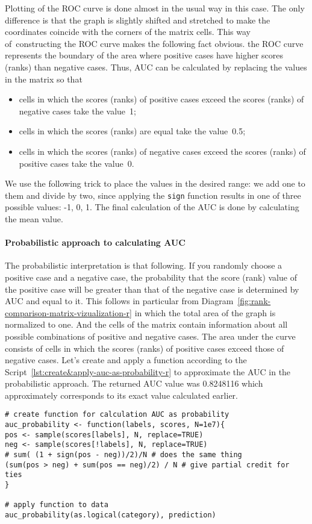 \documentclass[]{scrreprt}
\begin{document}
Plotting of the ROC curve is done almost in the usual way in this case. The only difference is that the graph is slightly shifted and stretched to make the coordinates coincide with the corners of the matrix cells. This way of~constructing the ROC curve makes the following fact obvious. the ROC curve represents the boundary of the area where positive cases have higher scores (ranks) than negative cases. Thus, AUC can be calculated by replacing the values in the matrix so that
\begin{itemize}
	\item cells in which the scores (ranks) of positive cases exceed the scores (ranks) of negative cases take the value~1;
	\item cells in which the scores (ranks) are equal take the value~0.5;
	\item cells in which the scores (ranks) of negative cases exceed the scores (ranks) of positive cases take the value~0.
\end{itemize}
We use the following trick to place the values in the desired range: we add one to them and divide by two, since applying the \texttt{sign} function results in one of three possible values: -1, 0, 1. The final calculation of the AUC is done by calculating the mean value.

\paragraph{Probabilistic approach to calculating AUC}
The probabilistic interpretation is that following.  If you randomly choose a positive case and a negative case, the probability that the score (rank) value of the positive case will be greater than that of the negative case is determined by AUC and equal to it. This follows in particular from Diagram~\ref{fig:rank-comparison-matrix-vizualization-r} in which the total area of the graph is normalized to one. And the cells of the matrix contain information about all possible combinations of positive and negative cases. The area under the curve consists of cells in which the scores (ranks) of positive cases exceed those of negative cases. Let's create and apply a function according to the Script~\ref{lst:create&apply-auc-as-probability-r} to approximate the AUC in the probabilistic approach. The returned AUC value was 0.8248116 which approximately corresponds to its exact value calculated earlier.
%
\begin{lstlisting}[float=htp, caption = Creating and applying a~function to calculate AUC as a~probability, firstnumber=1, label= lst:create&apply-auc-as-probability-r]
# create function for calculation AUC as probability
auc_probability <- function(labels, scores, N=1e7){
pos <- sample(scores[labels], N, replace=TRUE)
neg <- sample(scores[!labels], N, replace=TRUE)
# sum( (1 + sign(pos - neg))/2)/N # does the same thing
(sum(pos > neg) + sum(pos == neg)/2) / N # give partial credit for ties
}

# apply function to data
auc_probability(as.logical(category), prediction)
\end{lstlisting}
%
\end{document}
